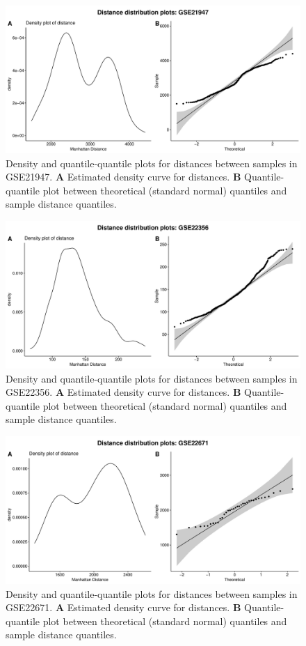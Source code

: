 \documentclass[10pt,letterpaper]{article}\usepackage[]{graphicx}\usepackage[]{color}
\begin{document}
\begin{figure}[H]
	\includegraphics[width=\textwidth]{manhattan-distance_hist_GSE21947.pdf}
	\caption{Density and quantile-quantile plots for distances between samples in GSE21947. \textbf{A} Estimated density curve for distances. \textbf{B} Quantile-quantile plot between theoretical (standard normal) quantiles and sample distance quantiles.}
\end{figure}

\begin{figure}[H]
	\includegraphics[width=\textwidth]{manhattan-distance_hist_GSE22356.pdf}
	\caption{Density and quantile-quantile plots for distances between samples in GSE22356. \textbf{A} Estimated density curve for distances. \textbf{B} Quantile-quantile plot between theoretical (standard normal) quantiles and sample distance quantiles.}
\end{figure}

\begin{figure}[H]
	\includegraphics[width=\textwidth]{manhattan-distance_hist_GSE22671.pdf}
	\caption{Density and quantile-quantile plots for distances between samples in GSE22671. \textbf{A} Estimated density curve for distances. \textbf{B} Quantile-quantile plot between theoretical (standard normal) quantiles and sample distance quantiles.}
\end{figure}
\end{document}
